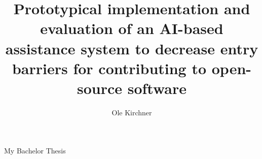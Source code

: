 \documentclass[12pt]{report}
\title{Prototypical implementation and evaluation of an AI-based  assistance system to decrease entry barriers for contributing to open-source software}
\author{Ole Kirchner}
\begin{document}
My Bachelor Thesis

\end{document}
